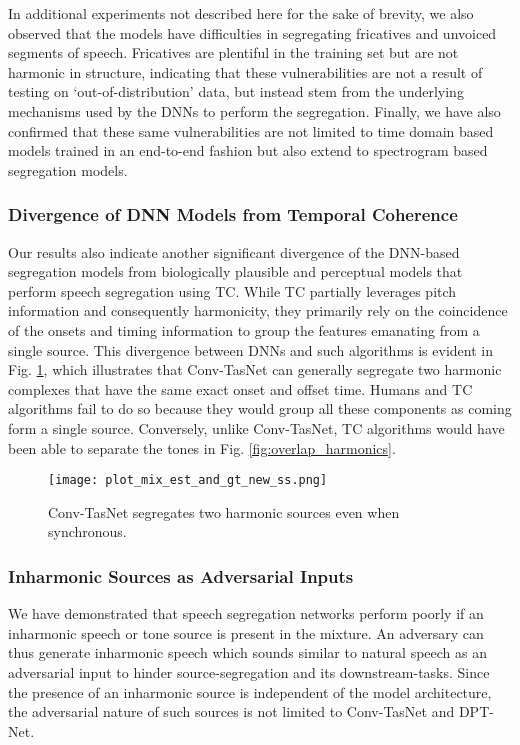 \documentclass{article}
\begin{document}
In additional experiments not described here for the sake of brevity, we also observed that the models have difficulties in segregating fricatives and unvoiced segments of speech. Fricatives are plentiful in the training set but are not harmonic in structure, indicating that these vulnerabilities are not a result of testing on `out-of-distribution' data, but instead  stem from the underlying mechanisms used by the DNNs to perform the segregation. Finally, we have also confirmed that these same vulnerabilities are not limited to time domain based models trained in an end-to-end fashion but also extend to spectrogram based segregation models.

\subsubsection{Divergence of DNN Models from Temporal Coherence} 
\vspace*{-1mm}
Our results also indicate another significant  divergence of the DNN-based segregation models from biologically plausible and perceptual models that perform speech segregation using TC. While TC partially leverages pitch information and consequently harmonicity, they primarily rely on the coincidence of the onsets and timing information to group the features emanating from a single source. This divergence between DNNs and such algorithms is evident in Fig. \ref{fig:asynchronous sources}, which illustrates that Conv-TasNet can generally segregate two harmonic complexes that have the same exact onset and offset time. Humans and TC algorithms fail to do so because they would group all these components as coming form a single source. Conversely, unlike Conv-TasNet, TC algorithms would have been able to separate the tones in Fig. \ref{fig:overlap_harmonics}.
\vspace*{-1mm}
\begin{figure}[]
  \centering
  \texttt{[image: plot\_mix\_est\_and\_gt\_new\_ss.png]}
  \caption{Conv-TasNet segregates two harmonic sources even when synchronous.}
  \vspace*{-4mm}
  \label{fig:asynchronous sources}
\end{figure}
\vspace*{-2mm}


\subsubsection{Inharmonic Sources as Adversarial Inputs}
\vspace*{-1mm}
We have demonstrated that speech segregation networks perform poorly if an inharmonic speech or tone source is present in the mixture. An adversary can thus generate inharmonic speech which sounds similar to natural speech as an adversarial input to hinder source-segregation and its downstream-tasks. Since the presence of an inharmonic source is independent of the model architecture, the adversarial nature of such sources is not limited to Conv-TasNet and DPT-Net. 
\end{document}
